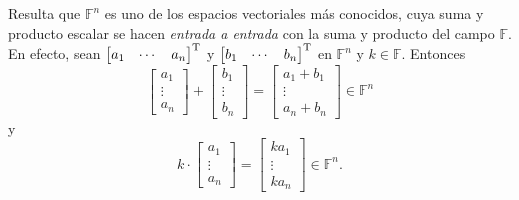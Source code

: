             Resulta que $\mathbb{F}^{n}$ es uno de los espacios vectoriales más conocidos, cuya suma y producto escalar se hacen \textit{entrada a entrada} con la suma y producto del campo $\mathbb{F}$. En efecto, sean $\begin{bmatrix} a_{1} & \cdots & a_{n}\end{bmatrix} ^{\textnormal{T}}$ y $\begin{bmatrix} b_{1} & \cdots & b_{n} \end{bmatrix} ^{\textnormal{T}}$ en $\mathbb{F}^{n}$ y $k \in \mathbb{F}$. Entonces
                $$
                \begin{bmatrix}
                a_{1} \\
                \vdots \\
                a_{n}
                \end{bmatrix} + \begin{bmatrix}
                b_{1} \\
                \vdots \\
                b_{n}
                \end{bmatrix}  =\begin{bmatrix}
                a_{1} + b_{1} \\
                \vdots \\
                a_{n} + b_{n}
                \end{bmatrix} \in \mathbb{F}^{n}
                $$ y $$ k \cdot\begin{bmatrix}
                a_{1} \\
                \vdots \\
                a_{n}
                \end{bmatrix} = \begin{bmatrix}
                ka_{1} \\
                \vdots \\
                ka_{n}
                \end{bmatrix} \in \mathbb{F}^{n}.$$

